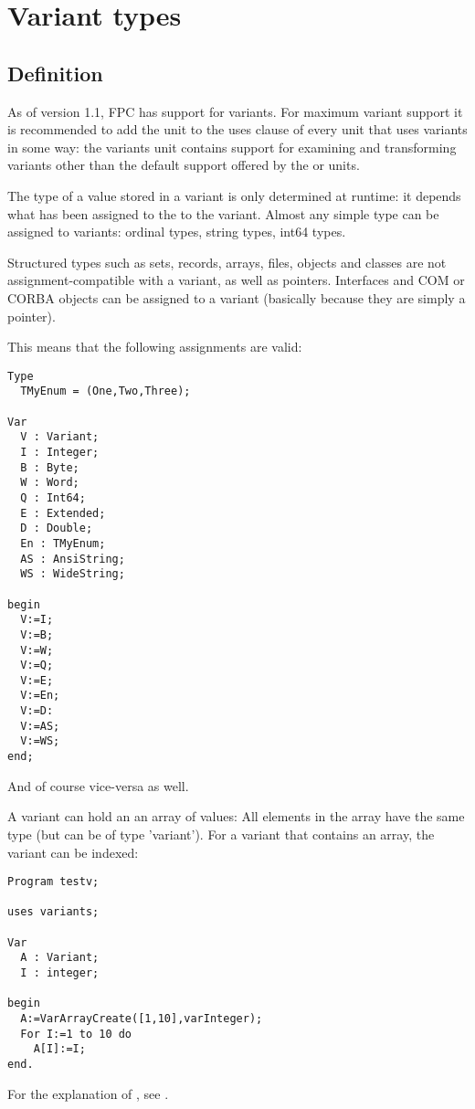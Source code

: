 \section{Variant types}
\subsection{Definition}
As of version 1.1, FPC has support for variants. For maximum variant support 
it is recommended to add the  unit to the uses clause of every 
unit that uses variants in some way: the variants unit contains support for
examining and transforming variants other than the default support offered
by the  or  units.

The type of a value stored in a variant is only determined at runtime: 
it depends what has been assigned to the to the variant. Almost any simple type 
can be assigned to variants: ordinal types, string types, int64 types.

Structured types such as sets, records, arrays, files, objects and classes 
are not assignment-compatible with a variant, as well as pointers. 
Interfaces and COM or CORBA objects can be assigned to a
variant (basically because they are simply a pointer).

This means that the following assignments are valid:
\begin{verbatim}
Type
  TMyEnum = (One,Two,Three);

Var
  V : Variant;
  I : Integer;
  B : Byte;
  W : Word;
  Q : Int64;
  E : Extended;
  D : Double;
  En : TMyEnum;
  AS : AnsiString;
  WS : WideString;

begin
  V:=I;
  V:=B;
  V:=W;
  V:=Q;
  V:=E;
  V:=En;
  V:=D:
  V:=AS;
  V:=WS;
end;
\end{verbatim}
And of course vice-versa as well.

A variant can hold an an array of values: All elements in the array have
the same type (but can be of type 'variant'). For a variant 
that contains an array, the variant can be indexed:
\begin{verbatim}
Program testv;

uses variants;

Var
  A : Variant;
  I : integer;

begin
  A:=VarArrayCreate([1,10],varInteger);
  For I:=1 to 10 do
    A[I]:=I;
end.
\end{verbatim}
For the explanation of , see \unitsref.

